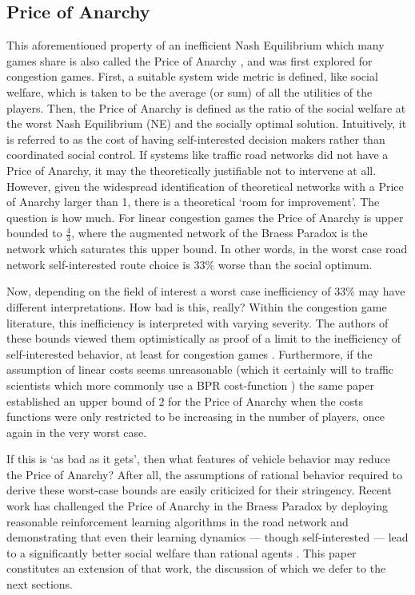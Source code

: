 \subsection{Price of Anarchy}

This aforementioned property of an inefficient Nash Equilibrium which many games share is also called the Price of Anarchy \cite{koutsoupias1999worst}, and was first explored for congestion games. First, a suitable system wide metric is defined, like social welfare, which is taken to be the average (or sum) of all the utilities of the players. Then, the Price of Anarchy is defined as the ratio of the social welfare at the worst Nash Equilibrium (NE) and the socially optimal solution. Intuitively, it is referred to as the cost of having self-interested decision makers rather than coordinated social control. If systems like traffic road networks did not have a Price of Anarchy, it may the theoretically justifiable not to intervene at all. However, given the widespread identification of theoretical networks with a Price of Anarchy larger than 1, there is a theoretical `room for improvement'. The question is how much. For linear congestion games the Price of Anarchy is upper bounded to $\frac{4}{3}$, where the augmented network of the Braess Paradox is the network which saturates this upper bound. In other words, in the worst case road network self-interested route choice is $33\%$ worse than the social optimum.

Now, depending on the field of interest a worst case inefficiency of $33\%$ may have different interpretations. How bad is this, really? Within the congestion game literature, this inefficiency is interpreted with varying severity. The authors of these bounds viewed them optimistically as proof of a limit to the inefficiency of self-interested behavior, at least for congestion games \cite{roughgarden2002bad}. Furthermore, if the assumption of linear costs seems unreasonable (which it certainly will to traffic scientists which more commonly use a BPR cost-function \cite{us1964traffic}) the same paper established an upper bound of $2$ for the Price of Anarchy when the costs functions were only restricted to be increasing in the number of players, once again in the very worst case.

If this is `as bad as it gets', then what features of vehicle behavior may reduce the Price of Anarchy? After all, the assumptions of rational behavior required to derive these worst-case bounds are easily criticized for their stringency. Recent work has challenged the Price of Anarchy in the Braess Paradox by deploying reasonable reinforcement learning algorithms in the road network and demonstrating that even their learning dynamics --- though self-interested --- lead to a significantly better social welfare than rational agents \cite{carissimo2024counter}. This paper constitutes an extension of that work, the discussion of which we defer to the next sections.

